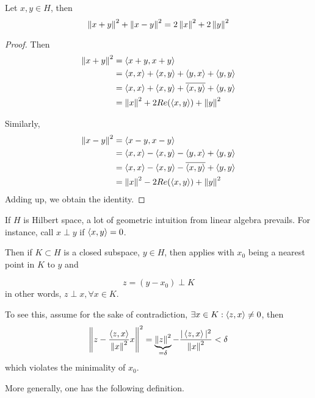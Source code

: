 \documentclass{article}
\begin{document}
\begin{proposition}\rm\label{parallelogram}\nextline
	Let $x,y\in H$, then
	$$
		\left\|{x+y}\right\|^2+\left\|{x-y}\right\|^2=2\left\|{x}\right\|^2+2\left\|{y}\right\|^2
	$$
\end{proposition}
\begin{unexaminable}
	\begin{proof}
		Then
		\begin{equation}
			\begin{split}
				\left\|{x+y}\right\|^2&=\left<{x+y},{x+y}\right>\\
				&=\left<{x},{x}\right>+\left<{x},{y}\right>+\left<{y},{x}\right>+\left<{y},{y}\right>\\
				&=\left<{x},{x}\right>+\left<{x},{y}\right>+{\overline{\left<{x},{y}\right>}}+\left<{y},{y}\right>\\
				&=\left\|{x}\right\|^2+2Re(\left<{x},{y}\right>)+\left\|{y}\right\|^2
			\end{split}
		\end{equation}

		Similarly,
		\begin{equation}
			\begin{split}
				\left\|{x-y}\right\|^2&=\left<{x-y},{x-y}\right>\\
				&=\left<{x},{x}\right>-\left<{x},{y}\right>-\left<{y},{x}\right>+\left<{y},{y}\right>\\
				&=\left<{x},{x}\right>-\left<{x},{y}\right>-{\overline{\left<{x},{y}\right>}}+\left<{y},{y}\right>\\
				&=\left\|{x}\right\|^2-2Re(\left<{x},{y}\right>)+\left\|{y}\right\|^2
			\end{split}
		\end{equation}
		Adding up, we obtain the identity.
	\end{proof}
\end{unexaminable}


If $H$ is Hilbert space,  a lot of geometric intuition from linear algebra prevails. For instance, call $x \perp y$ if $\left<{x},{y}\right>=0$.

Then if $K\subset H$ is a closed subspace, $y \in H$, then  applies with $x_0$ being a nearest point in $K$ to $y$ and

$$
	z = (y-x_0) \perp K
$$
in other words, $z\perp x, \forall x \in K$.

To see this, assume for the sake of contradiction, $\exists x \in K: \left<{z},{x}\right> \neq 0$, then
$$
	\left\|{z - \frac{\left<{z},{x}\right>}{\left\|{x}\right\|^2}x}\right\|^2 = \underbrace{\left\|{z}\right\|^2}_{=\delta} - \frac{|\left<{z},{x}\right>|^2}{\left\|{x}\right\|^2}<\delta
$$
which violates the minimality of $x_0$.

More generally, one has the following definition.  
\end{document}

